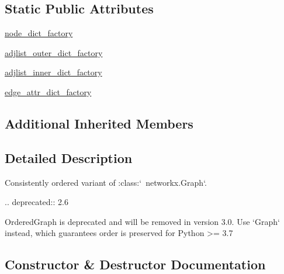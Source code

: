 \subsection*{Static Public Attributes}
\begin{DoxyCompactItemize}
\item 
\hyperlink{classnetworkx_1_1classes_1_1ordered_1_1OrderedGraph_ae8bde62903be88bf4c87a99f8850536d}{node\+\_\+dict\+\_\+factory}
\item 
\hyperlink{classnetworkx_1_1classes_1_1ordered_1_1OrderedGraph_a144cf9ca107bdee8830bab3da519ffde}{adjlist\+\_\+outer\+\_\+dict\+\_\+factory}
\item 
\hyperlink{classnetworkx_1_1classes_1_1ordered_1_1OrderedGraph_a88970ba4b6119da5835082ab5ae51d93}{adjlist\+\_\+inner\+\_\+dict\+\_\+factory}
\item 
\hyperlink{classnetworkx_1_1classes_1_1ordered_1_1OrderedGraph_a90d727fbb5b4d57a38ddee352a3fdba7}{edge\+\_\+attr\+\_\+dict\+\_\+factory}
\end{DoxyCompactItemize}
\subsection*{Additional Inherited Members}


\subsection{Detailed Description}
\begin{DoxyVerb}Consistently ordered variant of :class:`~networkx.Graph`.

.. deprecated:: 2.6

   OrderedGraph is deprecated and will be removed in version 3.0.
   Use `Graph` instead, which guarantees order is preserved for
   Python >= 3.7
\end{DoxyVerb}
 

\subsection{Constructor \& Destructor Documentation}
\mbox{\label{classnetworkx_1_1classes_1_1ordered_1_1OrderedGraph_a9b1d1a9f7af2fb66b7b83f715aa79c75}} 
